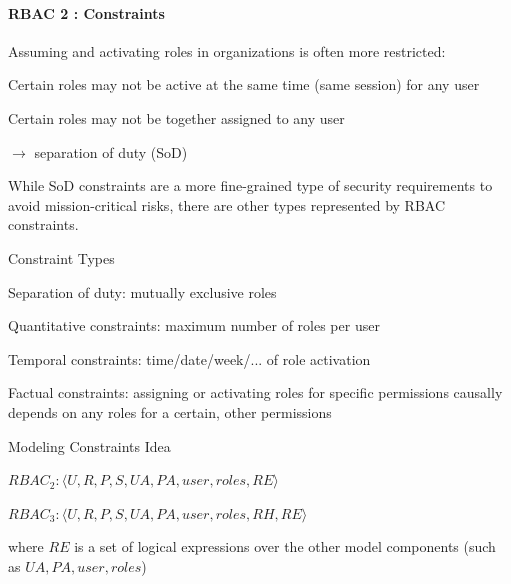 \documentclass[a4paper]{article}
\begin{document}
\begin{multicols}{3}
    \paragraph{RBAC 2 : Constraints}
    Assuming and activating roles in organizations is often more restricted:
    \begin{itemize*}
        \item Certain roles may not be active at the same time (same session) for any user
        \item Certain roles may not be together assigned to any user
        \item $\rightarrow$ separation of duty (SoD)
        \item While SoD constraints are a more fine-grained type of security requirements to avoid mission-critical risks, there are other types represented by RBAC constraints.
    \end{itemize*}
    Constraint Types
    \begin{itemize*}
        \item Separation of duty: mutually exclusive roles
        \item Quantitative constraints: maximum number of roles per user
        \item Temporal constraints: time/date/week/... of role activation
        \item Factual constraints: assigning or activating roles for specific permissions causally depends on any roles for a certain, other permissions
    \end{itemize*}
    Modeling Constraints Idea
    \begin{itemize*}
        \item $RBAC_2: \langle U,R,P,S,UA,PA,user,roles,RE\rangle$
        \item $RBAC_3: \langle U,R,P,S,UA,PA,user,roles,RH,RE\rangle$
        \item where $RE$ is a set of logical expressions over the other model components (such as $UA,PA,user,roles$)
    \end{itemize*}


\end{multicols}
\end{document}
